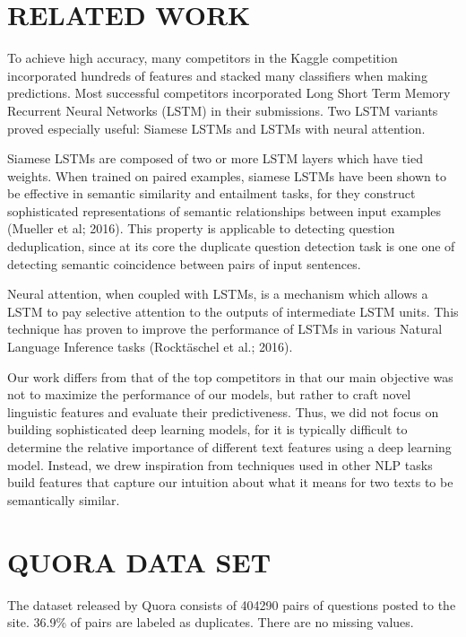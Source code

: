\documentclass[letterpaper, 10 pt, conference]{ieeeconf}  %
\begin{document}
\section{RELATED WORK}

To achieve high accuracy, many competitors in the Kaggle competition incorporated hundreds of features and stacked many classifiers when making predictions. Most successful competitors incorporated Long Short Term Memory Recurrent Neural Networks (LSTM) in their submissions. Two LSTM variants proved especially useful: Siamese LSTMs and LSTMs with neural attention.

Siamese LSTMs are composed of two or more LSTM layers which have tied weights. When trained on paired examples, siamese LSTMs have been shown to be effective in semantic similarity and entailment tasks, for they construct sophisticated representations of semantic relationships between input examples (Mueller et al; 2016). This property is applicable to detecting question deduplication, since at its core the duplicate question detection task is one one of detecting semantic coincidence between pairs of input sentences.

Neural attention, when coupled with LSTMs, is a mechanism which allows a LSTM to pay selective attention to the outputs of intermediate LSTM units. This technique has proven to improve the performance of LSTMs in various Natural Language Inference tasks (Rocktäschel et al.; 2016).

Our work differs from that of the top competitors in that our main objective was not to maximize the performance of our models, but rather to craft novel linguistic features and evaluate their predictiveness. Thus, we did not focus on building sophisticated deep learning models, for it is typically difficult to determine the relative importance of different text features using a deep learning model. Instead, we drew inspiration from techniques used in other NLP tasks build features that capture our intuition about what it means for two texts to be semantically similar.


\section{QUORA DATA SET}

The dataset released by Quora consists of 404290 pairs of questions posted to the site. 36.9\% of pairs are labeled as duplicates. There are no missing values. 
\end{document}
